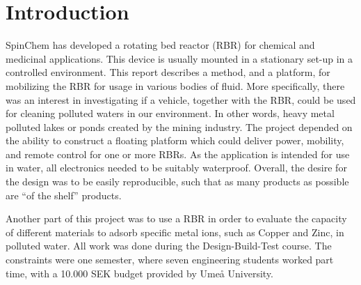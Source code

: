 \section{Introduction}

SpinChem\textsuperscript{\textregistered} has developed a rotating bed reactor (RBR) for chemical and medicinal
applications. This device is usually mounted in a stationary set-up in a
controlled environment. This report describes a method, and a platform, for
mobilizing the RBR for usage in various bodies of fluid. More specifically,
there was an interest in investigating if a vehicle, together with the RBR,
could be used for cleaning polluted waters in our environment. In other words, heavy metal
polluted lakes or ponds created by the mining industry. The project depended on
the ability to construct a floating platform which could deliver power,
mobility, and remote control for one or more RBRs. As the application is intended for
use in water, all electronics needed to be suitably waterproof. Overall, the
desire for the design was to be easily reproducible, such that as many products as
possible are ``of the shelf'' products.

Another part of this project was to use a RBR in order to evaluate the capacity of
different materials to adsorb specific metal ions, such as Copper and Zinc, in
polluted water. All work was done during the Design-Build-Test course. The constraints were one semester, where seven engineering students worked
part time, with a 10.000 SEK budget provided by Umeå University.
